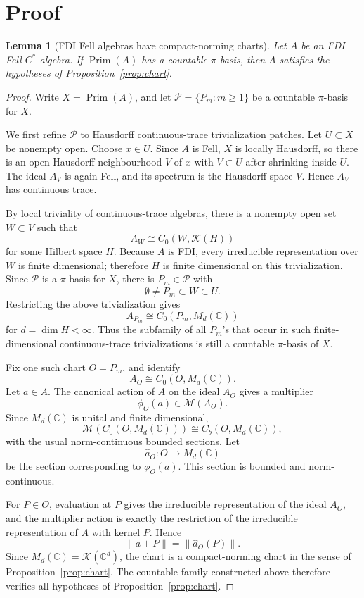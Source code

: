 \documentclass[11pt]{article}
\newtheorem{lemma}{Lemma}
\newcommand{\C}{\mathbb C}
\newcommand{\Kcal}{\mathcal K}
\newcommand{\Prim}{\operatorname{Prim}}
\newcommand{\Mcal}{\mathcal M}
\begin{document}
\section*{Proof}

\begin{lemma}[FDI Fell algebras have compact-norming charts]
\label{lem:charts}
Let \(A\) be an FDI Fell \(C^*\)-algebra.  If \(\Prim(A)\) has a countable
\(\pi\)-basis, then \(A\) satisfies the hypotheses of
Proposition~\ref{prop:chart}.
\end{lemma}

\begin{proof}
Write \(X=\Prim(A)\), and let \(\mathcal P=\{P_m:m\ge1\}\) be a countable
\(\pi\)-basis for \(X\).

We first refine \(\mathcal P\) to Hausdorff continuous-trace trivialization
patches.  Let \(U\subset X\) be nonempty open.  Choose \(x\in U\).  Since
\(A\) is Fell, \(X\) is locally Hausdorff, so there is an open Hausdorff
neighbourhood \(V\) of \(x\) with \(V\subset U\) after shrinking inside
\(U\).  The ideal \(A_V\) is again Fell, and its spectrum is the Hausdorff
space \(V\).  Hence \(A_V\) has continuous trace.

By local triviality of continuous-trace algebras, there is a nonempty open
set \(W\subset V\) such that
\[
        A_W\cong C_0(W,\Kcal(H))
\]
for some Hilbert space \(H\).  Because \(A\) is FDI, every irreducible
representation over \(W\) is finite dimensional; therefore \(H\) is
finite dimensional on this trivialization.  Since \(\mathcal P\) is a
\(\pi\)-basis for \(X\), there is \(P_m\in\mathcal P\) with
\[
        \emptyset\ne P_m\subset W\subset U.
\]
Restricting the above trivialization gives
\[
        A_{P_m}\cong C_0(P_m,M_d(\C))
\]
for \(d=\dim H<\infty\).  Thus the subfamily of all \(P_m\)'s that occur in
such finite-dimensional continuous-trace trivializations is still a countable
\(\pi\)-basis of \(X\).

Fix one such chart \(O=P_m\), and identify
\[
        A_O\cong C_0(O,M_d(\C)).
\]
Let \(a\in A\).  The canonical action of \(A\) on the ideal \(A_O\) gives a
multiplier
\[
        \phi_O(a)\in \Mcal(A_O).
\]
Since \(M_d(\C)\) is unital and finite dimensional,
\[
        \Mcal(C_0(O,M_d(\C)))\cong C_b(O,M_d(\C)),
\]
with the usual norm-continuous bounded sections.  Let
\[
        \widehat a_O:O\to M_d(\C)
\]
be the section corresponding to \(\phi_O(a)\).  This section is bounded and
norm-continuous.

For \(P\in O\), evaluation at \(P\) gives the irreducible representation of
the ideal \(A_O\), and the multiplier action is exactly the restriction of
the irreducible representation of \(A\) with kernel \(P\).  Hence
\[
        \|a+P\|=\|\widehat a_O(P)\|.
\]
Since \(M_d(\C)=\Kcal(\C^d)\), the chart is a compact-norming chart in the
sense of Proposition~\ref{prop:chart}.  The countable family constructed
above therefore verifies all hypotheses of Proposition~\ref{prop:chart}.
\end{proof}
\end{document}
